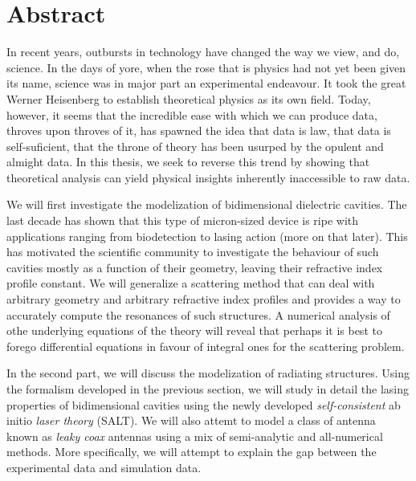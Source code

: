 \chapter*{Abstract}

In recent years, outbursts in technology have changed the way 
we view, and do, science. In the days of yore, when the rose
that is physics had not yet been given its name, science
was in major part an experimental endeavour. It took the great
Werner Heisenberg to establish theoretical physics as its own field. 
Today, however, it seems that the incredible ease with which we 
can produce data, throves upon throves of it, has spawned the idea
that data is law, that data is self-suficient, that the throne of 
theory has been usurped by the opulent and almight data. In this
thesis, we seek to reverse this trend by showing that theoretical 
analysis can yield physical insights inherently inaccessible to
raw data. 

We will first investigate the modelization of bidimensional dielectric
cavities. The last decade has shown that this type of micron-sized device
is ripe with applications ranging from biodetection to lasing action (more on that
later). This has motivated the scientific community to investigate the behaviour
of such cavities mostly as a function of their geometry, leaving their refractive index
profile constant. We will generalize a scattering method that can deal with 
arbitrary geometry and arbitrary refractive index profiles and provides
a way to accurately compute the resonances of such structures. 
A numerical analysis of othe underlying equations of the theory will
reveal that perhaps it is best to forego differential equations 
in favour of integral ones for the scattering problem. 

In the second part, we will discuss the modelization of radiating structures. 
Using the formalism developed in the previous section, we will study in detail the 
lasing properties of bidimensional cavities using the newly developed
\textit{self-consistent} ab initio \textit{laser theory} (SALT). We will
also attemt to model a class of antenna known as \textit{leaky coax} antennas using
a mix of semi-analytic and all-numerical methods. More specifically, we will attempt
to explain the gap between the experimental data and simulation data. 